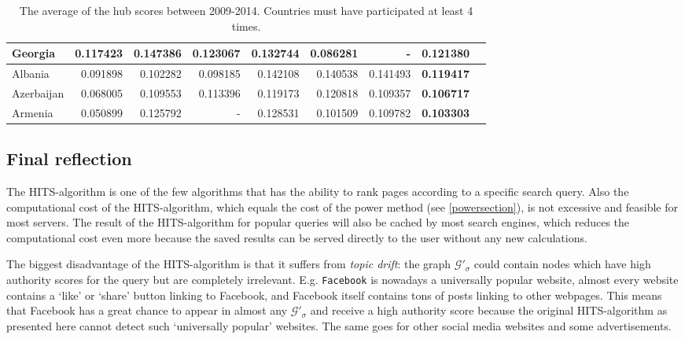 \documentclass[a4paper,11pt]{report}
\newcommand{\graf}{\mathscr{G}}
\begin{document}
\begin{table}[h!]
\begin{tabular}{|l|r|r|r|r|r|r|r|r|}
Georgia                                                    & 0.117423      & 0.147386      & 0.123067      & 0.132744      & 0.086281      & -             & \textbf{0.121380} \\ \hline
Albania                                                    & 0.091898      & 0.102282      & 0.098185      & 0.142108      & 0.140538      & 0.141493      & \textbf{0.119417} \\ \hline
Azerbaijan                                                 & 0.068005      & 0.109553      & 0.113396      & 0.119173      & 0.120818      & 0.109357      & \textbf{0.106717} \\ \hline
Armenia                                                    & 0.050899      & 0.125792      & -             & 0.128531      & 0.101509      & 0.109782      & \textbf{0.103303} \\ \hline
\end{tabular}
\caption{The average of the hub scores between 2009-2014. Countries must have participated at least 4 times.}
\end{table}\label{thub}

\subsection{Final reflection}
The HITS-algorithm is one of the few algorithms that has the ability to rank pages according to a specific search 
query.
Also the computational cost of the HITS-algorithm, which equals the cost of 
the power method (see \ref{powersection}), is not excessive and feasible for most servers. 
The result of the HITS-algorithm for popular queries will also be cached by most 
search engines, which reduces the computational cost even more because the saved results can be served
directly to the user without any new calculations. 

The biggest 
disadvantage of the HITS-algorithm is that it suffers from \emph{topic drift}: 
the graph $\graf'_\sigma$ could contain nodes which have high authority scores 
for the query but are completely irrelevant.  E.g. \texttt{Facebook} is nowadays a universally popular website, 
almost every website 
 contains a `like' or `share' button linking to Facebook, and Facebook itself contains tons of posts
 linking to other webpages. This means that Facebook has a great chance to appear in almost any
  $\graf'_\sigma$ and receive a high
 authority score because the original HITS-algorithm as presented here cannot detect such `universally popular' websites.  The same goes for other social media websites and some advertisements.
\end{document}
